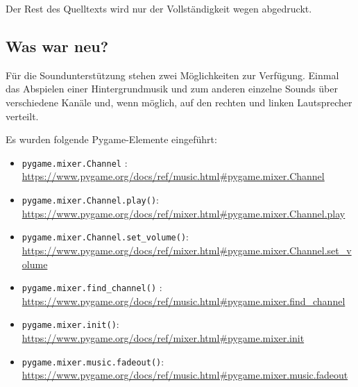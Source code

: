 Der Rest des Quelltexts wird nur der Vollständigkeit wegen abgedruckt.



\subsection*{Was war neu?}

Für die Soundunterstützung stehen zwei Möglichkeiten zur Verfügung. Einmal das Abspielen einer Hintergrundmusik und zum anderen einzelne Sounds über verschiedene Kanäle und, wenn möglich, auf den rechten und linken Lautsprecher verteilt.

Es wurden folgende Pygame-Elemente eingeführt:
\begin{itemize}
	\item\texttt{pygame.mixer.Channel} :
\\ \url{https://www.pygame.org/docs/ref/music.html#pygame.mixer.Channel}

	\item \texttt{pygame.mixer.Channel.play()}:
\\ \url{https://www.pygame.org/docs/ref/mixer.html#pygame.mixer.Channel.play}

	\item \texttt{pygame.mixer.Channel.set\_volume()}:
\\ \url{https://www.pygame.org/docs/ref/mixer.html#pygame.mixer.Channel.set_volume}

	\item\texttt{pygame.mixer.find\_channel()} :
\\ \url{https://www.pygame.org/docs/ref/music.html#pygame.mixer.find_channel}

	\item \texttt{pygame.mixer.init()}:
\\ \url{https://www.pygame.org/docs/ref/mixer.html#pygame.mixer.init}

	\item\texttt{pygame.mixer.music.fadeout()}:
\\ \url{https://www.pygame.org/docs/ref/music.html#pygame.mixer.music.fadeout}


\end{itemize}
